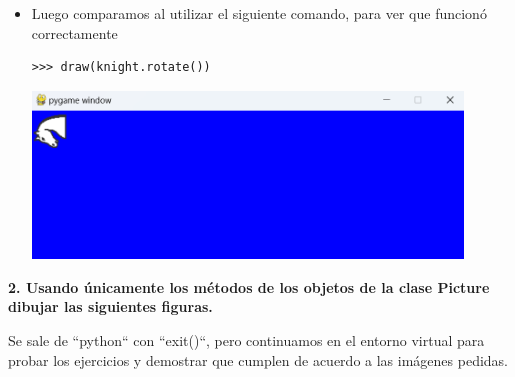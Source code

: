 \documentclass{article}
\begin{document}
\begin{itemize}
\begin{itemize}
      \item Luego comparamos al utilizar el siguiente comando, para ver que funcionó correctamente
      \begin{lstlisting}[style=shell]
      >>> draw(knight.rotate())
      \end{lstlisting}
      \begin{minipage}{\linewidth}
        \centering
        \includegraphics[width=0.9\textwidth]{imagenes/p_rotate2.png}
      \end{minipage}
    \end{itemize}
  
  \end{itemize}

  \pagebreak
  
  \textbf{2. Usando únicamente los métodos de los objetos de la clase Picture dibujar las siguientes figuras.}

  \vspace{\baselineskip}

  Se sale de ``python`` con ``exit()``, pero continuamos en el entorno virtual para probar los ejercicios y demostrar que cumplen de acuerdo a las imágenes pedidas.

  \vspace{\baselineskip}
\end{document}
